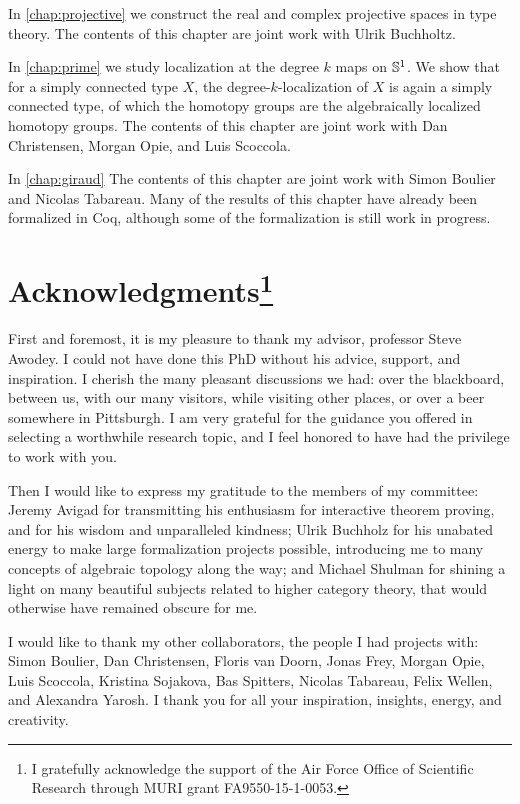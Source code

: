 In \cref{chap:projective} we construct the real and complex projective spaces in type theory. 
The contents of this chapter are joint work with Ulrik Buchholtz. 

In \cref{chap:prime} we study localization at the degree $k$ maps on $\mathbb{S}^{1}$. We show that for a simply connected type $X$, the degree-$k$-localization of $X$ is again a simply connected type, of which the homotopy groups are the algebraically localized homotopy groups. 
The contents of this chapter are joint work with Dan Christensen, Morgan Opie, and Luis Scoccola.

In \cref{chap:giraud}
The contents of this chapter are joint work with Simon Boulier and Nicolas Tabareau. Many of the results of this chapter have already been formalized in Coq, although some of the formalization is still work in progress.

\section{Acknowledgments\footnote{I gratefully acknowledge the support of the Air Force Office of Scientific Research through MURI grant FA9550-15-1-0053.}}
First and foremost, it is my pleasure to thank my advisor, professor Steve Awodey. I could not have done this PhD without his advice, support, and inspiration. I cherish the many pleasant discussions we had: over the blackboard, between us, with our many visitors, while visiting other places, or over a beer somewhere in Pittsburgh. I am very grateful for the guidance you offered in selecting a worthwhile research topic, and I feel honored to have had the privilege to work with you.

Then I would like to express my gratitude to the members of my committee: Jeremy Avigad for transmitting his enthusiasm for interactive theorem proving, and for his wisdom and unparalleled kindness; Ulrik Buchholz for his unabated energy to make large formalization projects possible, introducing me to many concepts of algebraic topology along the way; and Michael Shulman for shining a light on many beautiful subjects related to higher category theory, that would otherwise have remained obscure for me.

I would like to thank my other collaborators, the people I had projects with:
Simon Boulier, Dan Christensen, Floris van Doorn, Jonas Frey, Morgan Opie, Luis Scoccola, Kristina Sojakova, Bas Spitters, Nicolas Tabareau, Felix Wellen, and Alexandra Yarosh. I thank you for all your inspiration, insights, energy, and creativity.

